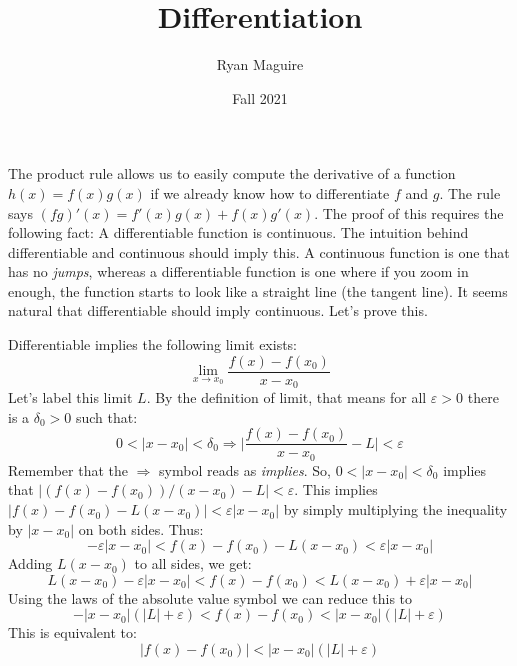 \documentclass{article}
\title{Differentiation}
\author{Ryan Maguire}
\date{Fall 2021}
\theoremstyle{normal}
\theoremstyle{plain}
\begin{document}
    \maketitle
    The product rule allows us to easily compute the derivative of a function
    $h(x)=f(x)g(x)$ if we already know how to differentiate $f$ and $g$.
    The rule says $(fg)'(x)=f'(x)g(x)+f(x)g'(x)$. The proof of this requires
    the following fact: A differentiable function is continuous. The intuition
    behind differentiable and continuous should imply this. A continuous
    function is one that has no \textit{jumps}, whereas a differentiable
    function is one where if you zoom in enough, the function starts to
    look like a straight line (the tangent line). It seems natural that
    differentiable should imply continuous. Let's prove this.
    \par\hfill\par
    Differentiable implies the following limit exists:
    \begin{equation}
        \lim_{x\rightarrow{x}_{0}}\frac{f(x)-f(x_{0})}{x-x_{0}}
    \end{equation}
    Let's label this limit $L$. By the definition of limit, that means for
    all $\varepsilon>0$ there is a $\delta_{0}>0$ such that:
    \begin{equation}
        0<|x-x_{0}|<\delta_{0}\Rightarrow
        \Big|\frac{f(x)-f(x_{0})}{x-x_{0}}-L\Big|<\varepsilon
    \end{equation}
    Remember that the $\Rightarrow$ symbol reads as \textit{implies}. So,
    $0<|x-x_{0}|<\delta_{0}$ implies that
    $|(f(x)-f(x_{0}))/(x-x_{0})-L|<\varepsilon$. This implies
    $|f(x)-f(x_{0})-L(x-x_{0})|<\varepsilon|x-x_{0}|$ by simply
    multiplying the inequality by $|x-x_{0}|$ on both sides. Thus:
    \begin{equation}
        -\varepsilon|x-x_{0}|<f(x)-f(x_{0})-L(x-x_{0})<\varepsilon|x-x_{0}|
    \end{equation}
    Adding $L(x-x_{0})$ to all sides, we get:
    \begin{equation}
        L(x-x_{0})-\varepsilon|x-x_{0}|<f(x)-f(x_{0})
            <L(x-x_{0})+\varepsilon|x-x_{0}|
    \end{equation}
    Using the laws of the absolute value symbol we can reduce this to
    \begin{equation}
        -|x-x_{0}|(|L|+\varepsilon)<f(x)-f(x_{0})<|x-x_{0}|(|L|+\varepsilon)
    \end{equation}
    This is equivalent to:
    \begin{equation}
        |f(x)-f(x_{0})|<|x-x_{0}|(|L|+\varepsilon)
    \end{equation}
\end{document}
